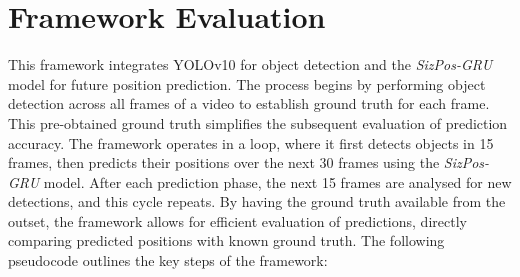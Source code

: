 \documentclass[12pt,oneside]{book} %
\begin{document}
\newpage
\section{Framework Evaluation}

This framework integrates YOLOv10 for object detection and the
\textit{SizPos-GRU} model for future position prediction. The process begins by
performing object detection across all frames of a video to establish ground
truth for each frame. This pre-obtained ground truth simplifies the subsequent
evaluation of prediction accuracy. The framework operates in a loop, where it
first detects objects in 15 frames, then predicts their positions over the next
30 frames using the \textit{SizPos-GRU} model. After each prediction phase, the
next 15 frames are analysed for new detections, and this cycle repeats. By
having the ground truth available from the outset, the framework allows for
efficient evaluation of predictions, directly comparing predicted positions
with known ground truth. The following pseudocode outlines the key steps of the
framework:
\end{document}
